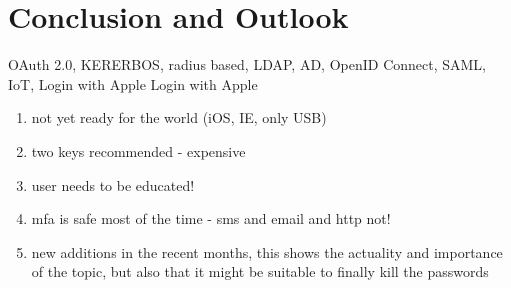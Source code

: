 \chapter{Conclusion and Outlook}

OAuth 2.0, KERERBOS, radius based, LDAP, AD, OpenID Connect, SAML, IoT, Login with Apple
Login with Apple %

\begin{enumerate}
	\item not yet ready for the world (iOS, IE, only USB)
	\item two keys recommended - expensive
	\item user needs to be educated!
	\item mfa is safe most of the time - sms and email and http not!
	\item new additions in the recent months, this shows the actuality and importance of the topic, but also that it might be suitable to finally kill the passwords
\end{enumerate}